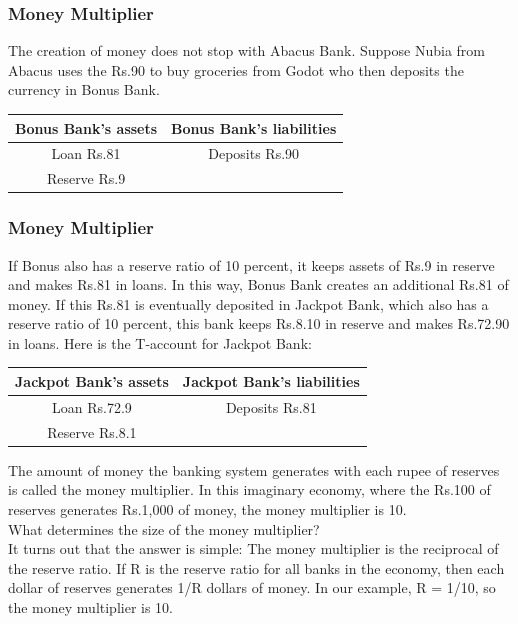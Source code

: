 \documentclass[shownotes,11pt, aspectratio=169]{beamer}
\begin{document}
\begin{frame}
\frametitle{Money Multiplier}
The creation of money does not stop with Abacus Bank. 
Suppose Nubia from Abacus uses the Rs.90 to buy groceries from Godot who then deposits the currency in Bonus Bank. \pause
\\
\vspace{3mm}
\begin{tabular}{cc}
\hline
Bonus Bank's assets &	Bonus Bank's liabilities \\
\hline
Loan Rs.81	& Deposits	Rs.90 \\
Reserve Rs.9 & \\
\hline
\end{tabular}
\end{frame}

\begin{frame}
\frametitle{Money Multiplier}
If Bonus also has a reserve ratio of 10 percent, it keeps assets of Rs.9 in reserve and makes Rs.81 in loans.
In this way, Bonus Bank creates an additional Rs.81 of money. If this Rs.81
is eventually deposited in Jackpot Bank, which also has a reserve ratio of
10 percent, this bank keeps Rs.8.10 in reserve and makes Rs.72.90 in loans. Here is the
T-account for Jackpot Bank: \pause
\\
\vspace{3mm}
\begin{tabular}{cc}
\hline
Jackpot Bank's assets & Jackpot Bank's liabilities \\
\hline
Loan Rs.72.9	& Deposits	Rs.81 \\
Reserve Rs.8.1 & \\
\hline
\end{tabular}
\end{frame}

\begin{frame}
The amount of money the banking system generates with
each rupee of reserves is called the money multiplier. In this imaginary economy,
where the Rs.100 of reserves generates Rs.1,000 of money, the money multiplier is 10. \\
\vspace{3mm}
What determines the size of the money multiplier? 
\\
\vspace{3mm}
\pause
It turns out that the answer
is simple: The money multiplier is the reciprocal of the reserve ratio. If R is the reserve
ratio for all banks in the economy, then each dollar of reserves generates 1/R dollars
of money. In our example, R = 1/10, so the money multiplier is 10.
\end{frame}
\end{document}
